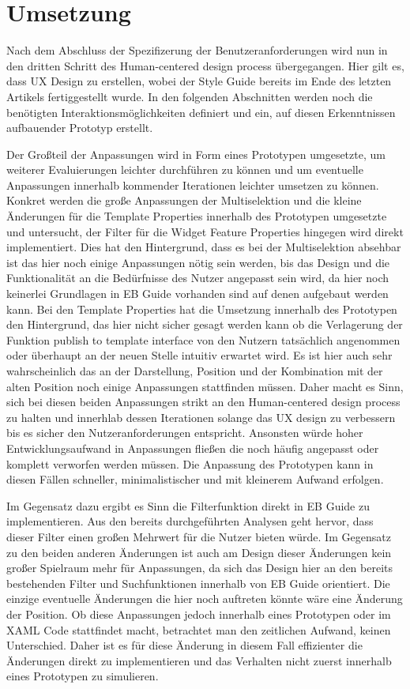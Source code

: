 \chapter{Umsetzung}\label{ch:experiments}

Nach dem Abschluss der Spezifizerung der Benutzeranforderungen wird nun in den dritten Schritt des Human-centered design process übergegangen.
Hier gilt es, dass UX Design zu erstellen, wobei der Style Guide bereits im Ende des letzten Artikels fertiggestellt wurde.
In den folgenden Abschnitten werden noch die benötigten Interaktionsmöglichkeiten definiert und ein, auf diesen Erkenntnissen aufbauender Prototyp erstellt.

Der Großteil der Anpassungen wird in Form eines Prototypen umgesetzte, um weiterer Evaluierungen leichter durchführen zu können und um eventuelle Anpassungen innerhalb kommender Iterationen leichter umsetzen zu können.
Konkret werden die große Anpassungen der Multiselektion und die kleine Änderungen für die Template Properties innerhalb des Prototypen umgesetzte und untersucht, der Filter für die Widget Feature Properties hingegen wird direkt implementiert.
Dies hat den Hintergrund, dass es bei der Multiselektion absehbar ist das hier noch einige Anpassungen nötig sein werden, bis das Design und die Funktionalität an die Bedürfnisse des Nutzer angepasst sein wird, da hier noch keinerlei Grundlagen in EB Guide vorhanden sind auf denen aufgebaut werden kann.
Bei den Template Properties hat die Umsetzung innerhalb des Prototypen den Hintergrund, das hier nicht sicher gesagt werden kann ob die Verlagerung der Funktion \glqq publish to template interface\grqq{} von den Nutzern tatsächlich angenommen oder überhaupt an der neuen Stelle intuitiv erwartet wird.
Es ist hier auch sehr wahrscheinlich das an der Darstellung, Position und der Kombination mit der alten Position noch einige Anpassungen stattfinden müssen.
Daher macht es Sinn, sich bei diesen beiden Anpassungen strikt an den Human-centered design process zu halten und innerhlab dessen Iterationen solange das UX design zu verbessern bis es sicher den Nutzeranforderungen entspricht.
Ansonsten würde hoher Entwicklungsaufwand in Anpassungen fließen die noch häufig angepasst oder komplett verworfen werden müssen.
Die Anpassung des Prototypen kann in diesen Fällen schneller, minimalistischer und mit kleinerem Aufwand erfolgen.

Im Gegensatz dazu ergibt es Sinn die Filterfunktion direkt in EB Guide zu implementieren.
Aus den bereits durchgeführten Analysen geht hervor, dass dieser Filter einen großen Mehrwert für die Nutzer bieten würde.
Im Gegensatz zu den beiden anderen Änderungen ist auch am Design dieser Änderungen kein großer Spielraum mehr für Anpassungen, da sich das Design hier an den bereits bestehenden Filter und Suchfunktionen innerhalb von EB Guide orientiert.
Die einzige eventuelle Änderungen die hier noch auftreten könnte wäre eine Änderung der Position.
Ob diese Anpassungen jedoch innerhalb eines Prototypen oder im XAML Code stattfindet macht, betrachtet man den zeitlichen Aufwand, keinen Unterschied.
Daher ist es für diese Änderung in diesem Fall effizienter die Änderungen direkt zu implementieren und das Verhalten nicht zuerst innerhalb eines Prototypen zu simulieren.

